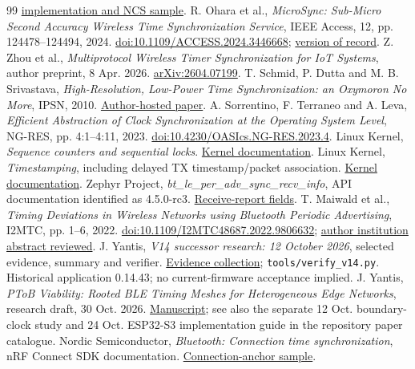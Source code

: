 \documentclass[10pt,letterpaper]{article}
\newcommand{\src}[1]{\nolinkurl{#1}}
\begin{document}
\begin{thebibliography}{99}
\href{https://github.com/nordic-auko/nRF5-ble-timesync-demo}{implementation and NCS sample}.
 R. Ohara et al., \emph{MicroSync: Sub-Micro Second Accuracy Wireless Time Synchronization Service}, IEEE Access, 12, pp. 124478--124494, 2024. \href{https://doi.org/10.1109/ACCESS.2024.3446668}{doi:10.1109/ACCESS.2024.3446668};
\href{https://da.lib.kobe-u.ac.jp/da/kernel/0100491658/0100491658.pdf}{version of record}.
 Z. Zhou et al., \emph{Multiprotocol Wireless Timer Synchronization for IoT Systems}, author preprint, 8 Apr. 2026. \href{https://arxiv.org/abs/2604.07199}{arXiv:2604.07199}.
 T. Schmid, P. Dutta and M. B. Srivastava, \emph{High-Resolution, Low-Power Time Synchronization: an Oxymoron No More}, IPSN, 2010. \href{https://people.eecs.berkeley.edu/~prabal/pubs/papers/schmid10vht.pdf}{Author-hosted paper}.
 A. Sorrentino, F. Terraneo and A. Leva, \emph{Efficient Abstraction of Clock Synchronization at the Operating System Level}, NG-RES, pp. 4:1--4:11, 2023. \href{https://doi.org/10.4230/OASIcs.NG-RES.2023.4}{doi:10.4230/OASIcs.NG-RES.2023.4}.
 Linux Kernel, \emph{Sequence counters and sequential locks}. \href{https://cdn.kernel.org/doc/html/latest/locking/seqlock.html}{Kernel documentation}.
 Linux Kernel, \emph{Timestamping}, including delayed TX timestamp/packet association. \href{https://cdn.kernel.org/doc/html/latest/networking/timestamping.html}{Kernel documentation}.
 Zephyr Project, \emph{bt\_le\_per\_adv\_sync\_recv\_info}, API documentation identified as 4.5.0-rc3. \href{https://docs.zephyrproject.org/latest/doxygen/html/structbt__le__per__adv__sync__recv__info.html}{Receive-report fields}.
 T. Maiwald et al., \emph{Timing Deviations in Wireless Networks using Bluetooth Periodic Advertising}, I2MTC, pp. 1--6, 2022. \href{https://doi.org/10.1109/I2MTC48687.2022.9806632}{doi:10.1109/I2MTC48687.2022.9806632};
\href{https://cris.fau.de/publications/269905857/}{author institution abstract reviewed}.
 J. Yantis, \emph{V14 successor research: 12 October 2026}, selected evidence, summary and verifier. \href{https://github.com/yantisj2/PToB/tree/main/evidence/v14/2026-10-12}{Evidence collection}; \src{tools/verify_v14.py}. Historical application 0.14.43; no current-firmware acceptance implied.
 J. Yantis, \emph{PToB Viability: Rooted BLE Timing Meshes for Heterogeneous Edge Networks}, research draft, 30 Oct. 2026. \href{https://github.com/yantisj2/PToB/blob/main/papers/ptob-viability-preprint.pdf}{Manuscript}; see also the separate 12 Oct. boundary-clock study and 24 Oct. ESP32-S3 implementation guide in the repository paper catalogue.
 Nordic Semiconductor, \emph{Bluetooth: Connection time synchronization}, nRF Connect SDK documentation. \href{https://nrfconnectdocs.nordicsemi.com/ncs/latest/nrf/samples/bluetooth/conn_time_sync/README.html}{Connection-anchor sample}.
\end{thebibliography}
\end{document}
